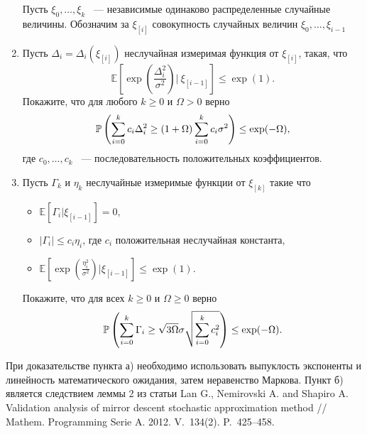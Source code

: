 \begin{problem} 

\begin{enumerate}
\label{sec:mirrorDescent}
Пусть $\xi_0,\dots,\xi_k$ ~--- независимые одинаково распределенные случайные величины. Обозначим за $\xi_{[i]}$ совокупность случайных величин $\xi_0,\dots,\xi_{i-1}$
\item
Пусть $\Delta_i = \Delta_i(\xi_{[i]})$ неслучайная измеримая функция от $\xi_{[i]}$, такая, что 
\begin{equation*}
\mathbb{E}\left[\exp\left(\frac{\Delta_i^2}{\sigma^2}\right) \vert \: \xi_{[i-1]}\right]\leq \mathrm{\exp(1)}.
\end{equation*}
Покажите, что для любого $k\geq 0$ и $\Omega>0$ верно 
\begin{equation*}
\mathrm{{\mathbb P}}\left(\sum_{i=0}^k c_i\Delta_i^2\geq (1+\Omega) \sum_{i=0}^kc_i\sigma^2\right)\leq \exp(-\Omega),
\end{equation*}
где $c_0,\dots,c_k$ ~--- последовательность положительных коэффициентов.
\item 
Пусть $\Gamma_k$ и $\eta_k$ неслучайные измеримые функции от $\xi_{[k]}$ такие что 
\begin{itemize}
\item $\mathbb{E}[\Gamma_i|\xi_{[i-1]}]=0,$
\item $|\Gamma_i|\leq c_i\eta_i$, где $c_i$ положительная неслучайная константа,
\item $\mathbb{E}\left[\exp\left(\frac{\eta_i^2}{\sigma^2}\right)|\xi_{[i-1]}\right]\leq \mathrm{\exp(1)}$.
\end{itemize}
Покажите, что для всех $k\geq 0$ и $\Omega\geq 0$ верно
\begin{equation*}
\mathrm{{\mathbb P}}\left(\sum_{i=0}^k \Gamma_i\geq \sqrt{3\Omega}\sigma\sqrt{\sum_{i=0}^kc_i^2}\right)\leq \exp(-\Omega).
\end{equation*}
\end{enumerate}
\begin{remark} 
При доказательстве пункта а) необходимо использовать выпуклость экспоненты и линейность математического ожидания, затем неравенство Маркова.
 Пункт б) является следствием леммы 2 из статьи  Lan G., Nemirovski A. and Shapiro A. Validation analysis of mirror descent stochastic approximation method // Mathem. Programming Serie A. 2012. V.~134(2). P.~425--458.
\end{remark}

\end{problem}

